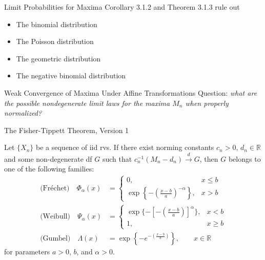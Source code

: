 \documentclass{beamer}
\begin{document}
\begin{frame}{Limit Probabilities for Maxima}
    Corollary 3.1.2 and Theorem 3.1.3 rule out
    \begin{itemize}
        \item The binomial distribution
        \item The Poisson distribution
        \item The geometric distribution
        \item The negative binomial distribution
    \end{itemize}
\end{frame}

\begin{frame}{Weak Convergence of Maxima Under Affine Transformations}
    Question: \textit{what are the possible nondegenerate limit laws for the maxima $M_n$ when properly normalized?}
\end{frame}

\begin{frame}{The Fisher-Tippett Theorem, Version 1}
    \begin{theorem}
        Let $\{X_n\}$ be a sequence of iid rvs. If there exist norming constants $c_n > 0$, $d_n \in \mathbb{R}$ and some non-degenerate df $G$ such that $c_n^{-1}(M_n - d_n) \xrightarrow{d} G$, then $G$ belongs to one of the following families:
        \begin{align*}
            \text{(Fr\'{e}chet)} \quad \Phi_{\alpha}(x) &=
            \begin{cases}
                0, & x \le b \\
                \exp\left\{-\left(\frac{x - b}{a}\right)^{-\alpha}\right\}, & x > b
            \end{cases} \\
            \text{(Weibull)} \quad \Psi_{\alpha}(x) &=
            \begin{cases}
                \exp\{-\left[-\left(\frac{x - b}{a}\right)\right]^{\alpha}\}, & x < b \\
                1, & x \ge b
            \end{cases} \\
            \text{(Gumbel)} \quad \Lambda(x) &= \exp\left\{-e^{-\left(\frac{x - b}{a}\right)}\right\}, \qquad x \in \mathbb{R}
        \end{align*}
        for parameters $a > 0$, $b$, and $\alpha > 0$.
    \end{theorem}
\end{frame}
\end{document}
